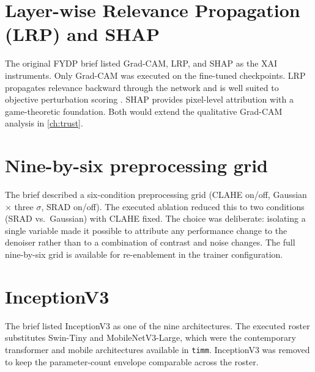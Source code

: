 \documentclass[../preamble.tex]{subfiles}
\begin{document}
\section{Layer-wise Relevance Propagation (LRP) and SHAP}
\label{app:designed-lrp-shap}

The original FYDP brief listed Grad-CAM, LRP, and SHAP as the XAI
instruments. Only Grad-CAM was executed on the fine-tuned checkpoints. LRP
propagates relevance backward through the network and is well suited to
objective perturbation scoring \cite{samek2017}. SHAP provides pixel-level
attribution with a game-theoretic foundation. Both would extend the
qualitative Grad-CAM analysis in \cref{ch:trust}.

\section{Nine-by-six preprocessing grid}
\label{app:designed-9x6}

The brief described a six-condition preprocessing grid (CLAHE on/off,
Gaussian $\times$ three $\sigma$, SRAD on/off). The executed ablation
reduced this to two conditions (SRAD vs.\ Gaussian) with CLAHE fixed. The
choice was deliberate: isolating a single variable made it possible to
attribute any performance change to the denoiser rather than to a
combination of contrast and noise changes. The full nine-by-six grid is
available for re-enablement in the trainer configuration.

\section{InceptionV3}
\label{app:designed-inception}

The brief listed InceptionV3 as one of the nine architectures. The executed
roster substitutes Swin-Tiny and MobileNetV3-Large, which were the
contemporary transformer and mobile architectures available in
\texttt{timm}. InceptionV3 was removed to keep the parameter-count envelope
comparable across the roster.
\end{document}
